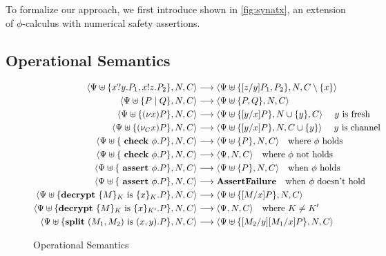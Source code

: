 \documentclass[master,english]{kuisthesis}
\theoremstyle{definition}
\begin{document}
To formalize our approach, we first introduce \langname{} shown in \autoref{fig:synatx}, an extension of $\phi$-calculus with numerical safety assertions.

\subsection{Operational Semantics}

\begin{figure}[h!]
\centering
\begin{align*}
\langle\Psi \uplus\{x?y.P_1, x!z.P_2\}, N, C\rangle &\longrightarrow \langle\Psi \uplus\{[z / y]P_1, P_2\}, N, C \setminus \{x\}\rangle \\
\langle\Psi \uplus\{P \mid Q\}, N, C\rangle &\longrightarrow\langle\Psi \uplus\{P, Q\}, N, C\rangle \\
\langle\Psi \uplus\{(\nu x) P\}, N, C\rangle &\longrightarrow\langle\Psi \uplus\{[y / x] P\}, N \cup \{y\}, C\rangle \quad \text{ $y$ is fresh}\\
\langle\Psi \uplus\{(\nu_C x) P\}, N, C\rangle &\longrightarrow\langle\Psi \uplus\{[y / x] P\}, N, C \cup \{y\}\rangle \quad \text{ $y$ is channel}\\
\langle\Psi \uplus\{\text { \textbf{check} } \phi . P\} , N, C\rangle &\longrightarrow \langle\Psi \uplus\{P\} , N, C\rangle \quad \text{where $\phi$ holds}\\
\langle\Psi \uplus\{\text { \textbf{check} } \phi . P\}, N, C\rangle &\longrightarrow \langle\Psi, N, C\rangle \quad \text{where $\phi$ not holds} \\
\langle\Psi \uplus\{\text { \textbf{assert} } \phi . P\} , N, C\rangle&\longrightarrow \langle\Psi \uplus\{P\}, N, C\rangle \quad \text{when $\phi$ holds} \\
\langle\Psi \uplus\{\text { \textbf{assert} } \phi . P\}, N, C\rangle &\longrightarrow \textbf{AssertFailure} \quad \text{when $\phi$ doesn't hold} \\ 
\langle\Psi \uplus\{ \text{\textbf{decrypt}}\ \{M\}_K
\text{ is } \{x\}_K . P\} , N, C\rangle &\longrightarrow\langle\Psi \uplus\{[M / x] P\} , N, C \rangle\\
\langle\Psi \uplus\{ \text{\textbf{decrypt}}\ \{M\}_K
\text{ is } \{x\}_{K'} . P\} , N, C\rangle &\longrightarrow\langle\Psi, N, C\rangle \quad \text{where $K \not= K'$} \\
\langle\Psi \uplus\{ \text{\textbf{split}}\ (M_1, M_2)
\text{ is } (x, y) . P\}, N, C\rangle &\longrightarrow\langle\Psi \uplus\{[M_2 / y][M_1 / x] P\}, N, C \rangle\\
\end{align*}
    \caption{Operational Semantics}
    \label{fig:semantics}
\end{figure}
\end{document}
